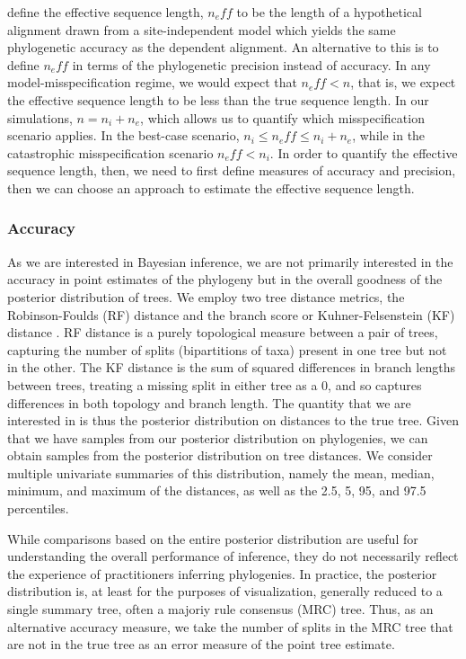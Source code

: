 \documentclass[11pt]{article}
\begin{document}
\citet{nasrallah2011quantifying} define the effective sequence length, $n_eff$ to be the length of a hypothetical alignment drawn from a site-independent model which yields the same phylogenetic accuracy as the dependent alignment.
An alternative to this is to define $n_eff$ in terms of the phylogenetic precision instead of accuracy.
In any model-misspecification regime, we would expect that $n_eff < n$, that is, we expect the effective sequence length to be less than the true sequence length.
In our simulations, $n = n_i + n_e$, which allows us to quantify which misspecification scenario applies.
In the best-case scenario, $n_i \leq n_eff \leq n_i + n_e$, while in the catastrophic misspecification scenario $n_eff < n_i$.
In order to quantify the effective sequence length, then, we need to first define measures of accuracy and precision, then we can choose an approach to estimate the effective sequence length.



\subsubsection*{Accuracy\label{sec:error}}
As we are interested in Bayesian inference, we are not primarily interested in the accuracy in point estimates of the phylogeny but in the overall goodness of the posterior distribution of trees.
We employ two tree distance metrics, the Robinson-Foulds (RF) distance \citep{robinson1981comparison} and the branch score or Kuhner-Felsenstein (KF) distance \citep{kuhner1994simulation}.
RF distance is a purely topological measure between a pair of trees, capturing the number of splits (bipartitions of taxa) present in one tree but not in the other.
The KF distance is the sum of squared differences in branch lengths between trees, treating a missing split in either tree as a 0, and so captures differences in both topology and branch length.
The quantity that we are interested in is thus the posterior distribution on distances to the true tree.
Given that we have samples from our posterior distribution on phylogenies, we can obtain samples from the posterior distribution on tree distances.
We consider multiple univariate summaries of this distribution, namely the mean, median, minimum, and maximum of the distances, as well as the 2.5, 5, 95, and 97.5 percentiles.

While comparisons based on the entire posterior distribution are useful for understanding the overall performance of inference, they do not necessarily reflect the experience of practitioners inferring phylogenies.
In practice, the posterior distribution is, at least for the purposes of visualization, generally reduced to a single summary tree, often a majoriy rule consensus (MRC) tree.
Thus, as an alternative accuracy measure, we take the number of splits in the MRC tree that are not in the true tree as an error measure of the point tree estimate.
\end{document}

